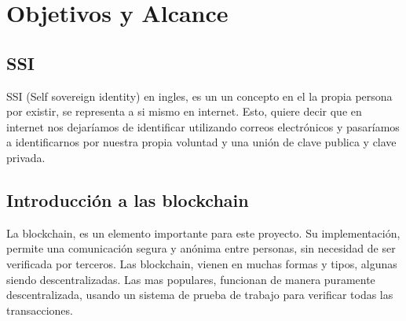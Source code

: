 \chapter{Objetivos y Alcance}\label{oya}

\thispagestyle{fancy}



\section*{SSI}
SSI (Self sovereign identity) en ingles, es un un concepto en el la propia persona por existir, se representa a si mismo en internet. Esto, quiere decir que en internet nos dejaríamos de identificar utilizando correos electrónicos y pasaríamos a identificarnos por nuestra propia voluntad y una unión de clave publica y clave privada.

\section*{Introducción a las blockchain}
La blockchain, es un elemento importante para este proyecto. Su implementación, permite una comunicación segura y anónima entre personas, sin necesidad de ser verificada por terceros. Las blockchain, vienen en muchas formas y tipos, algunas siendo descentralizadas. Las mas populares, funcionan de manera puramente descentralizada, usando un sistema de prueba de trabajo para verificar todas las transacciones.

\newpage
\thispagestyle{empty}